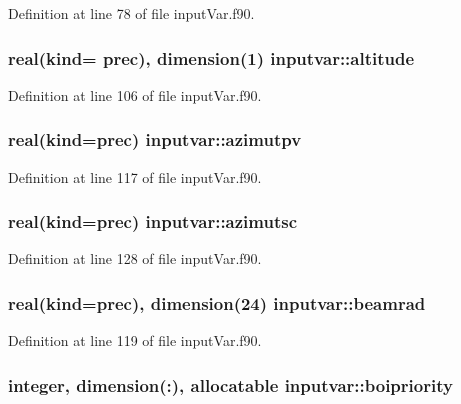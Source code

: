 Definition at line 78 of file input\-Var.\-f90.

\hypertarget{classinputvar_a3f078edd3f3cfd59802ac6321ad3b837}{
\subsubsection[{altitude}]{\setlength{\rightskip}{0pt plus 5cm}real(kind= prec), dimension(1) inputvar\-::altitude}}\label{classinputvar_a3f078edd3f3cfd59802ac6321ad3b837}


Definition at line 106 of file input\-Var.\-f90.

\hypertarget{classinputvar_ae36a6ce527f47c090cf19f733d28b6d7}{
\subsubsection[{azimutpv}]{\setlength{\rightskip}{0pt plus 5cm}real(kind=prec) inputvar\-::azimutpv}}\label{classinputvar_ae36a6ce527f47c090cf19f733d28b6d7}


Definition at line 117 of file input\-Var.\-f90.

\hypertarget{classinputvar_a55e23291eb7d5495b50199caabe3e529}{
\subsubsection[{azimutsc}]{\setlength{\rightskip}{0pt plus 5cm}real(kind=prec) inputvar\-::azimutsc}}\label{classinputvar_a55e23291eb7d5495b50199caabe3e529}


Definition at line 128 of file input\-Var.\-f90.

\hypertarget{classinputvar_a32edbf52e3022964fd59a2a4d76a6b6d}{
\subsubsection[{beamrad}]{\setlength{\rightskip}{0pt plus 5cm}real(kind=prec), dimension(24) inputvar\-::beamrad}}\label{classinputvar_a32edbf52e3022964fd59a2a4d76a6b6d}


Definition at line 119 of file input\-Var.\-f90.

\hypertarget{classinputvar_a87efe639d66848f1a52e1c265e175e2c}{
\subsubsection[{boipriority}]{\setlength{\rightskip}{0pt plus 5cm}integer, dimension(\-:), allocatable inputvar\-::boipriority}}\label{classinputvar_a87efe639d66848f1a52e1c265e175e2c}


